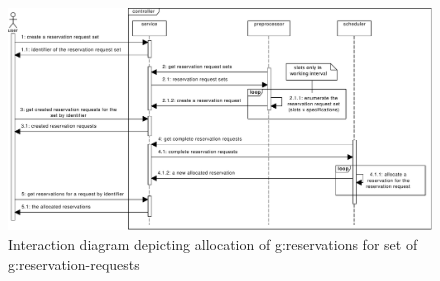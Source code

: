 \begin{figure}[ht!]
\includegraphics[width=\textwidth]{diagrams/sd_reservation_request_set_allocation}
\caption{Interaction diagram depicting allocation of \glspl{g:reservation} for set of \glspl{g:reservation-request}}
\label{fig:sd_reservation_request_set_allocation}
\end{figure}

